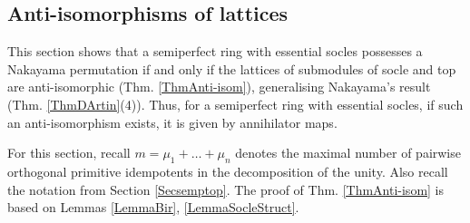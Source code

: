 \documentclass[11pt]{article}
\theoremstyle{plain}
\theoremstyle{remark}
\theoremstyle{plain}
\begin{document}
\subsection{Anti-isomorphisms of lattices}\label{SecDIsom}

This section shows that a semiperfect ring with essential socles possesses a Nakayama permutation if and only if the lattices of submodules of socle and top are anti-isomorphic (Thm. \ref{ThmAnti-isom}), generalising Nakayama's result (Thm. \ref{ThmDArtin}(4)). Thus, for a semiperfect ring with essential socles, if such an anti-isomorphism exists, it is given by annihilator maps. 

For this section, recall $m=\mu_1+\dots +\mu_n$ denotes the maximal number of pairwise orthogonal primitive idempotents in the decomposition of the unity. Also recall the notation from Section \ref{Secsemptop}. The proof of Thm. \ref{ThmAnti-isom} is based on Lemmas  \ref{LemmaBir}, \ref{LemmaSocleStruct}.

\smallskip 
\end{document}

